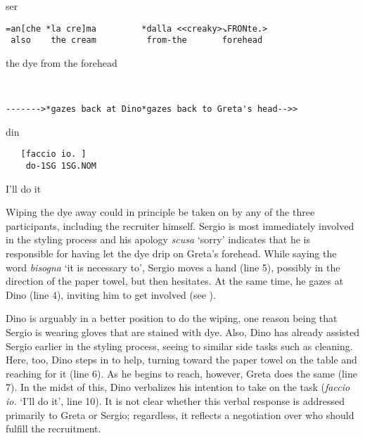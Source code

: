 \documentclass[output=paper,modfonts]{langscibook}
\begin{document}
%
\begin{transbox}{8}{ser}
\begin{verbatim}
=an[che *la cre]ma         *dalla <<creaky>↘FRONte.>
 also    the cream          from-the       forehead
\end{verbatim}
\hspace{0.07cm} the dye from the forehead
\end{transbox}\vspace{1mm}
%
\begin{transbox}{9}{~}
\begin{verbatim}
------->*gazes back at Dino*gazes back to Greta's head-->>
\end{verbatim}
\end{transbox}\vspace{-1.5mm}
%
\begin{transbox}{10}{din}
\begin{verbatim}
   [faccio io. ]
    do-1SG 1SG.NOM
\end{verbatim}
\hspace{0.5cm} I'll do it
\end{transbox}\bigskip

Wiping the dye away could in principle be taken on by any of the three participants, including the recruiter himself. Sergio is most immediately involved in the styling process and his apology \textit{scusa} ‘sorry’ indicates that he is responsible for having let the dye drip on Greta's forehead. While saying the word \textit{bisogna} ‘it is necessary to’, Sergio moves a hand (line 5), possibly in the direction of the paper towel, but then hesitates. At the same time, he gazes at Dino (line 4), inviting him to get involved (see \citealt[chap. 3]{StiversRossano2010,Rossano2012}). 

Dino is arguably in a better position to do the wiping, one reason being that Sergio is wearing gloves that are stained with dye. Also, Dino has already assisted Sergio earlier in the styling process, seeing to similar side tasks such as cleaning. Here, too, Dino steps in to help, turning toward the paper towel on the table and reaching for it (line 6). As he begins to reach, however, Greta does the same (line 7). In the midst of this, Dino verbalizes his intention to take on the task (\textit{faccio io.} ‘I'll do it’, line 10). It is not clear whether this verbal response is addressed primarily to Greta or Sergio; regardless, it reflects a negotiation over who should fulfill the recruitment.
\end{document}
